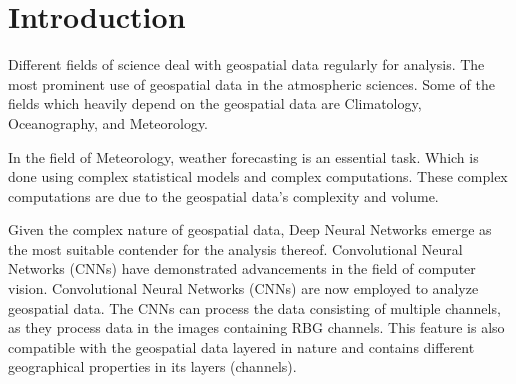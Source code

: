 \clearpage
\cleardoublepage

\chapter{Introduction}

Different fields of science deal with geospatial data regularly for analysis.
The most prominent use of geospatial data in the atmospheric sciences. Some of the fields
which heavily depend on the geospatial data are Climatology, Oceanography, and Meteorology.

In the field of Meteorology, weather forecasting is an essential task. Which is done using complex statistical models and complex computations.
These complex computations are due to the geospatial data's
complexity and volume.

Given the complex nature of geospatial data,
Deep Neural Networks emerge as the most suitable contender for the analysis thereof. Convolutional Neural Networks (CNNs) have demonstrated advancements in the field of computer
vision. Convolutional Neural Networks (CNNs) are now employed to analyze geospatial data. The CNNs can process the data consisting of multiple channels, as they process
data in the images containing RBG channels. This feature is also compatible with the geospatial data layered in nature and contains different geographical properties in its layers
(channels).


